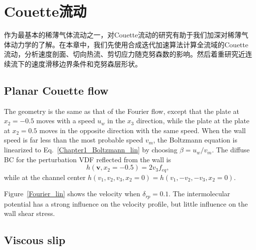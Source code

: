 

\chapter{Couette流动}
\label{chap:linearized}

作为最基本的稀薄气体流动之一，对Couette流动的研究有助于我们加深对稀薄气体动力学的了解。在本章中，我们先使用合成迭代加速算法计算全流域的Couette流动，分析速度剖面、切向热流、剪切应力随克努森数的影响。然后着重研究近连续流下的速度滑移边界条件和克努森层形状。


\section{Planar Couette flow}\label{linear_Couette_flow}
The geometry is the same as that of the Fourier flow, except that the plate at $x_2=-0.5$ moves with a speed $u_{w}$ in the $x_3$ direction, while the  plate at the plate at $x_2=0.5$ moves in the opposite direction with the same speed. When the wall speed is far less than the most probable speed $v_m$, the Boltzmann equation is linearized to Eq.~\eqref{Chapter1_Boltzmann_lin} by choosing $\beta=u_{w}/v_m$. The diffuse BC for the perturbation VDF reflected from the wall is 
\begin{equation}
h(\bm{v},x_2=-0.5)=2v_3f_{eq}, %
\end{equation} while at the channel center $h(v_1,v_2,v_3,x_2=0)=h(v_1,-v_2,-v_3,x_2=0)$. 


Figure~\ref{Fourier_lin} shows the velocity when $\delta_{rp}=0.1$.  The intermolecular potential has a strong influence on the velocity profile, but little influence on the wall shear stress.  

\section{Viscous slip}



